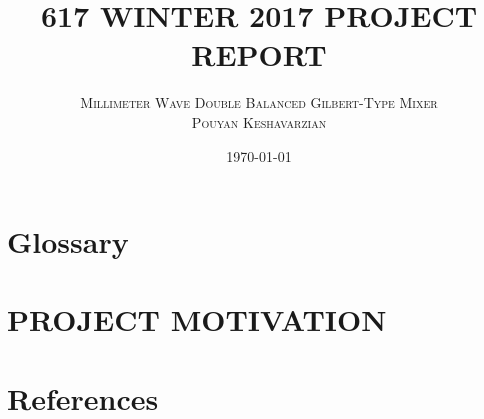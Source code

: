 \documentclass{article}                                                         %
\title{\textsc{\textbf{617 WINTER 2017 PROJECT REPORT}}} %
\author{\textsc{Millimeter Wave Double Balanced Gilbert-Type Mixer}
\\ \textsc{Pouyan Keshavarzian}}
\date{\today} %
\begin{document}
\maketitle %
\newpage
\tableofcontents
\listoffigures
\listoftables
\newpage
\section{Glossary}
\printglossary[title=Terms Acronyms and Abbreviations]
\newpage
\section{PROJECT MOTIVATION}


\newpage
\section{References}
\printbibliography[heading=none]
\begin{appendices}

\end{appendices}
\end{document}
